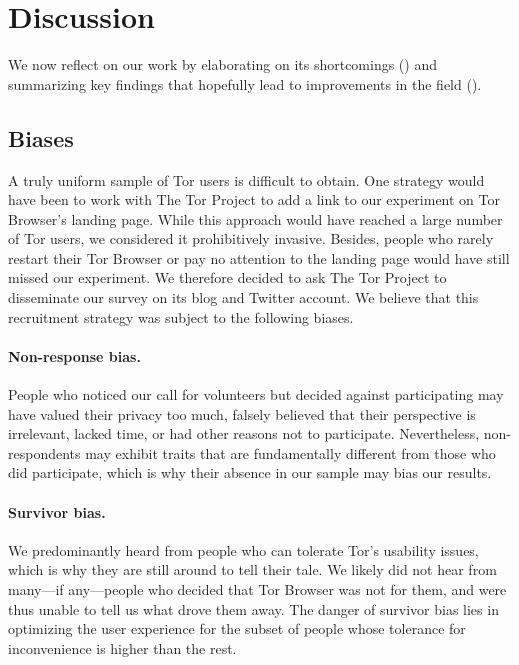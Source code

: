 \section{Discussion}
\label{sec:discussion}

We now reflect on our work by elaborating on its shortcomings
() and summarizing key findings that hopefully lead to
improvements in the field ().

\subsection{Biases}
\label{sec:biases}

A truly uniform sample of Tor users is difficult to obtain.  One strategy would
have been to work with The Tor Project to add a link to our experiment on Tor
Browser's landing page.  While this approach would have reached a large number
of Tor users, we considered it prohibitively invasive.  Besides, people who
rarely restart their Tor Browser or pay no attention to the landing page would
have still missed our experiment.  We therefore decided to ask The Tor Project
to disseminate our survey on its blog and Twitter account.  We believe that this
recruitment strategy was subject to the following biases.

\paragraph{Non-response bias.}
People who noticed our call for volunteers but decided against participating may
have valued their privacy too much, falsely believed that their perspective is
irrelevant, lacked time, or had other reasons not to participate.  Nevertheless,
non-respondents may exhibit traits that are fundamentally different from those
who did participate, which is why their absence in our sample may bias our
results.

\paragraph{Survivor bias.}
We predominantly heard from people who can tolerate Tor's usability issues,
which is why they are still around to tell their tale.  We likely did not hear
from many---if any---people who decided that Tor Browser was not for them, and
were thus unable to tell us what drove them away.  The danger of survivor bias
lies in optimizing the user experience for the subset of people whose tolerance
for inconvenience is higher than the rest.

